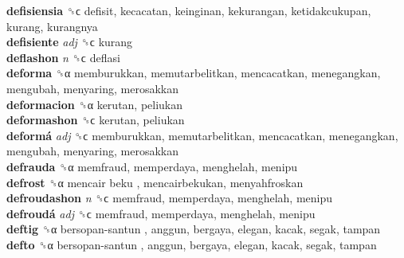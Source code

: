 \textbf{defisiensia} ␝ϲ  defisit, kecacatan, keinginan, kekurangan, ketidakcukupan, kurang, kurangnya  \\
\textbf{defisiente} \emph{adj}  ␝ϲ  kurang  \\
\textbf{deflashon} \emph{n}  ␝ϲ  deflasi  \\
\textbf{deforma} ␝α  memburukkan, memutarbelitkan, mencacatkan, menegangkan, mengubah, menyaring, merosakkan  \\
\textbf{deformacion} ␝α  kerutan, peliukan  \\
\textbf{deformashon} ␝ϲ  kerutan, peliukan  \\
\textbf{deformá} \emph{adj}  ␝ϲ  memburukkan, memutarbelitkan, mencacatkan, menegangkan, mengubah, menyaring, merosakkan  \\
\textbf{defrauda} ␝α  memfraud, memperdaya, menghelah, menipu  \\
\textbf{defrost} ␝α   mencair beku , mencairbekukan, menyahfroskan  \\
\textbf{defroudashon} \emph{n}  ␝ϲ  memfraud, memperdaya, menghelah, menipu  \\
\textbf{defroudá} \emph{adj}  ␝ϲ  memfraud, memperdaya, menghelah, menipu  \\
\textbf{deftig} ␝α   bersopan-santun , anggun, bergaya, elegan, kacak, segak, tampan  \\
\textbf{defto} ␝α   bersopan-santun , anggun, bergaya, elegan, kacak, segak, tampan  \\
